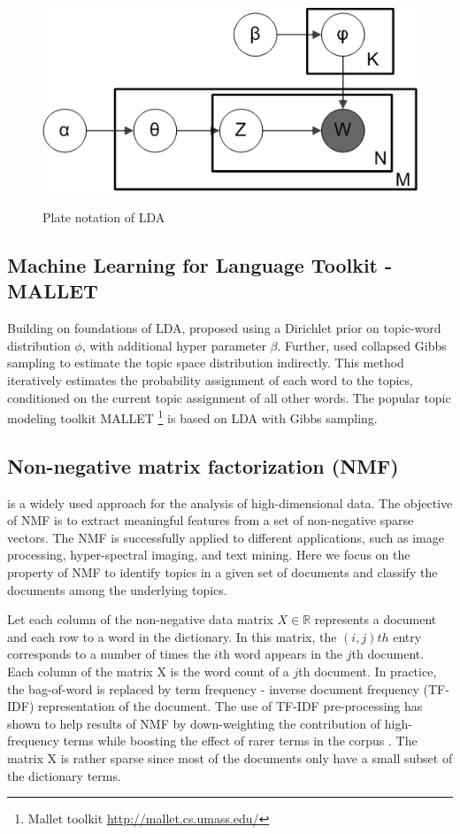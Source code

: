 \begin{figure}[t]
\caption{Plate notation of LDA }
\includegraphics[scale=.5]{img/lda.png}
\centering
\label{fig:ldamodel}
\end{figure}

\subsection{Machine Learning for Language Toolkit - MALLET}
Building on foundations of LDA, \cite{Griffiths} proposed using a Dirichlet prior on topic-word distribution $\phi$, with additional hyper parameter $\beta$. Further, \cite{Griffiths} used collapsed Gibbs sampling to estimate the topic space distribution indirectly. This method iteratively estimates the probability assignment of each word to the topics, conditioned on the current topic assignment of all other words. The popular topic modeling toolkit MALLET \footnote{Mallet toolkit \url{http://mallet.cs.umass.edu/}} is based on LDA with Gibbs sampling.


\subsection{Non-negative matrix factorization (NMF)} is a widely used approach for the analysis of high-dimensional data. The objective of NMF is to extract meaningful features from a set of non-negative sparse vectors. The NMF is successfully applied to different applications, such as image processing, hyper-spectral imaging,  and text mining.  Here we focus on the property of NMF to identify topics in a given set of documents and classify the documents among the underlying topics.

Let each column of the non-negative data matrix $X \in \mathbb{R}$ represents a document and each row to a word in the dictionary. In this matrix, the $(i, j)th$ entry corresponds to a number of times the $i$th word appears in the $j$th document. Each column of the matrix X is the word count of a $j$th document. In practice, the bag-of-word is replaced by term frequency - inverse document frequency (TF-IDF) representation of the document. The use of TF-IDF pre-processing has shown to help results of NMF by down-weighting the contribution of high-frequency terms while boosting the effect of rarer terms in the corpus \cite{Greene2016, Gillis2014}. The matrix X is rather sparse since most of the documents only have a small subset of the dictionary terms.

